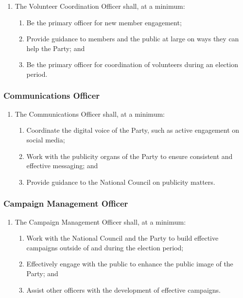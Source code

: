 \documentclass[a4paper,titlepage,8.5pt]{article}
\begin{document}
\begin{enumerate}
\item The Volunteer Coordination Officer shall, at a minimum:
\begin{enumerate}
    \item Be the primary officer for new member engagement;
    \item Provide guidance to members and the public at large on ways they can help the Party; and
    \item Be the primary officer for coordination of volunteers during an election period.
\end{enumerate}
\end{enumerate}

\subsubsection{Communications Officer}

\begin{enumerate}
\item The Communications Officer shall, at a minimum:
\begin{enumerate}
    \item Coordinate the digital voice of the Party, such as active engagement on social media;
    \item Work with the publicity organs of the Party to ensure consistent and effective messaging; and
    \item Provide guidance to the National Council on publicity matters.
\end{enumerate}
\end{enumerate}

\subsubsection{Campaign Management Officer}
\begin{enumerate}
\item The Campaign Management Officer shall, at a minimum:
\begin{enumerate}
    \item Work with the National Council and the Party to build effective campaigns outside of and during the election period;
    \item Effectively engage with the public to enhance the public image of the Party; and
    \item Assist other officers with the development of effective campaigns.
\end{enumerate}
\end{enumerate}
\end{document}

